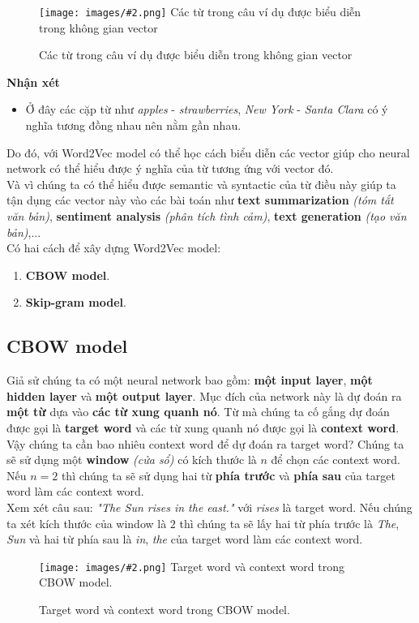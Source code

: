 \documentclass[12pt]{article}
\newcommand{\itemsizePaddingLeft}{\setlength{\itemindent}{0.6cm}}
\newcommand{\includeImage}[3]{
\begin{figure}[H]
  \centering
  \texttt{[image: images/\#2.png]}
  \def\temp{#3}\ifx\temp\empty\else\caption{#3}\fi
\end{figure}}
\begin{document}
\includeImage{0.95}{02}{Các từ trong câu ví dụ được biểu diễn trong không gian vector}
\begin{tcolorbox}[grow to left by=-0.6cm]
  \textbf{Nhận xét}
  \begin{itemize}
    \item Ở đây các cặp từ như \textsl{apples} - \textsl{strawberries}, \textsl{New York} - \textsl{Santa Clara} có ý nghĩa tương đồng nhau nên nằm gần nhau.
  \end{itemize}
\end{tcolorbox}

\vskip 0.5cm
\indent Do đó, với Word2Vec model có thể học cách biểu diễn các vector giúp cho neural network có thể hiểu được ý nghĩa của từ tương ứng với vector đó.\\

\indent Và vì chúng ta có thể hiểu được semantic và syntactic của từ điều này giúp ta tận dụng các vector này vào các bài toán như \textbf{text summarization} \textit{(tóm tắt văn bản)}, \textbf{sentiment analysis} \textit{(phân tích tình cảm)}, \textbf{text generation} \textit{(tạo văn bản)},...\\

\indent Có hai cách để xây dựng Word2Vec model:
\begin{enumerate}
  \itemsizePaddingLeft
  \item \textbf{CBOW model}.
  \item \textbf{Skip-gram model}.
\end{enumerate}

\subsection{CBOW model}
Giả sử chúng ta có một neural network bao gồm: \textbf{một input layer}, \textbf{một hidden layer} và \textbf{một output layer}. Mục đích của network này là dự đoán ra \textbf{một từ} dựa vào \textbf{các từ xung quanh nó}. Từ mà chúng ta cố gắng dự đoán được gọi là \textbf{target word} và các từ xung quanh nó được gọi là \textbf{context word}.\\

\indent Vậy chúng ta cần bao nhiêu context word để dự đoán ra target word? Chúng ta sẽ sử dụng một \textbf{window} \textit{(cửa sổ)} có kích thước là $n$ để chọn các context word. Nếu $n = 2$ thì chúng ta sẽ sử dụng hai từ \textbf{phía trước} và \textbf{phía sau} của target word làm các context word.\\

\indent Xem xét câu sau: \textsl{"The Sun rises in the east."} với \textsl{rises} là target word. Nếu chúng ta xét kích thước của window là $2$ thì chúng ta sẽ lấy hai từ phía trước là \textsl{The}, \textsl{Sun} và hai từ phía sau là \textsl{in}, \textsl{the} của target word làm các context word.\\

\includeImage{0.7}{04}{Target word và context word trong CBOW model.}
\end{document}
